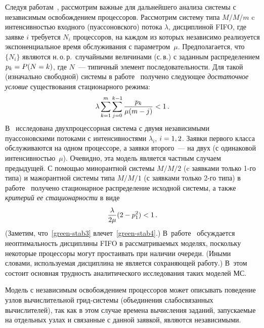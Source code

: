 \begin{multicols}{2}
Следуя работам~\cite{green80-1, green80, brill-green84}, рассмотрим важные
для дальнейшего анализа системы с независимым освобождением
процессоров. Рассмотрим систему
типа $M/M/m$ c интенсивностью входного (пуассоновского)  потока
$\lambda$, дисциплиной FIFO, где заявке $i$ требуется $N_i$
процессоров, на каждом из которых независимо реализуется
экспоненциальное  время обслуживания с параметром~$\mu$.
Предполагается, что  $\{N_i\}$ являются
н.\,о.\,р.\ случайными величинами
(с.\,в.)  с заданным распределением $p_k\hm=P(N=k)$, где  $N$~--- типичный
элемент последовательности. Для такой (изначально свободной) системы
в работе~\cite{green80} получено следующее {\it достаточное условие}
существования стационарного режима:
\begin{equation}
\label{green-stab3}
\lambda \sum\limits_{k=1}^m\sum_{j=0}^{k-1}
\displaystyle\frac{\displaystyle p_k\mathstrut}{\displaystyle \mu(m-j)\mathstrut}<1\,.
\end{equation}
В~\cite{brill-green84}  исследована  двухпроцессорная сис\-те\-ма с
двумя  независимыми пуассоновскими потоками с интенсивностями
$\lambda_i$, $i\hm=1,2$. Заявки первого класса обслуживаются на одном
процессоре, а заявки второго~--- на двух (с одинаковой
интенсивностью~$\mu$). Очевидно, эта модель является частным случаем
предыдущей. С помощью минорантной системы $M/M/2$ (c заявками только
1-го типа) и мажорантной системы типа $M/M/1$ (с заявками только
2-го типа) в работе~\cite{brill-green84} получено стационарное
распределение исходной системы, а также {\it критерий ее
стационарности}  в виде
\begin{equation}
\label{green-stab4}
 \displaystyle\frac{\displaystyle \lambda\mathstrut}{\displaystyle 2\mu\mathstrut}(2-p_{1}^{2})<1\,.
\end{equation}
(Заметим, что~\eqref{green-stab3} влечет~\eqref{green-stab4}.) 
В~работе~\cite{green80-1} обсуждается неоптимальность  дисциплины FIFO
в рассматриваемых моделях, поскольку  некоторые процессоры могут
простаивать при наличии очереди. (Иными словами, используемая
дисциплина не является сохраняющей работу.)  В~этом состоит основная
трудность аналитического исследования таких моделей МС.

Модель с независимым освобождением процессоров может описывать
поведение узлов вычислительной грид-сис\-те\-мы (объединения
слабосвязанных вычислителей), так как в этом случае времена вычисления
заданий, запускаемые на отдельных узлах и связанные с данной
заявкой, являются  независимыми.


\end{multicols}
